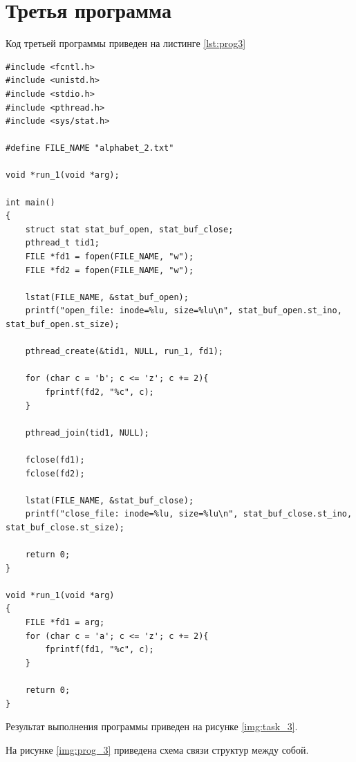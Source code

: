 \section{Третья программа}
Код третьей программы приведен на листинге \ref{lst:prog3}
\begin{lstlisting}[label=lst:prog3, caption=Код программы 3, basicstyle=\footnotesize]
#include <fcntl.h>
#include <unistd.h>
#include <stdio.h>
#include <pthread.h>
#include <sys/stat.h>

#define FILE_NAME "alphabet_2.txt"

void *run_1(void *arg);

int main()
{
	struct stat stat_buf_open, stat_buf_close;
	pthread_t tid1;
	FILE *fd1 = fopen(FILE_NAME, "w");
	FILE *fd2 = fopen(FILE_NAME, "w");
	
	lstat(FILE_NAME, &stat_buf_open);
	printf("open_file: inode=%lu, size=%lu\n", stat_buf_open.st_ino, stat_buf_open.st_size);
	
	pthread_create(&tid1, NULL, run_1, fd1);
	
	for (char c = 'b'; c <= 'z'; c += 2){
		fprintf(fd2, "%c", c);
	}
	
	pthread_join(tid1, NULL);
	
	fclose(fd1);
	fclose(fd2);
	
	lstat(FILE_NAME, &stat_buf_close);
	printf("close_file: inode=%lu, size=%lu\n", stat_buf_close.st_ino, stat_buf_close.st_size);
	
	return 0;
}

void *run_1(void *arg)
{
	FILE *fd1 = arg;
	for (char c = 'a'; c <= 'z'; c += 2){
		fprintf(fd1, "%c", c);
	}
	
	return 0;
}
\end{lstlisting}

Результат выполнения программы приведен на рисунке \ref{img:task_3}.
\begin{figure}[H]
\end{figure}

На рисунке \ref{img:prog_3} приведена схема связи структур между собой.
\begin{figure}[H]
\end{figure}